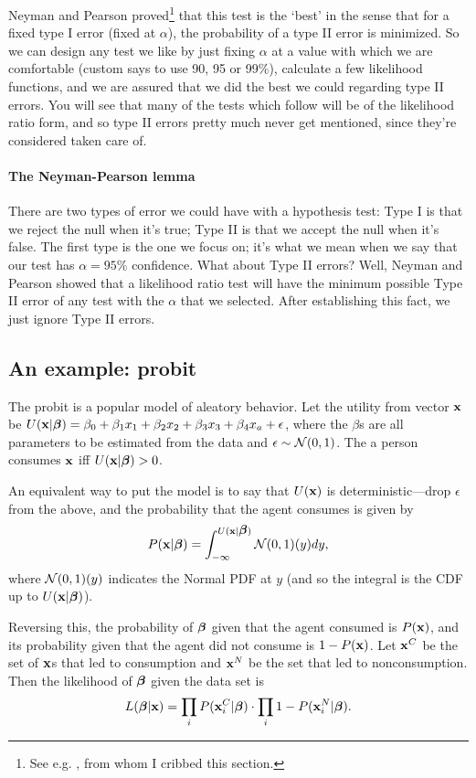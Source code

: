 Neyman and Pearson proved\footnote{See
e.g. \cite[189--191]{amemiya:ez}, from whom I cribbed
this section.}  that this test is the `best' in the sense that for a
fixed type I error (fixed at $\alpha$), the probability of a type II
error is minimized. So we can design any test we like by just fixing $\alpha$
at a value with which we are comfortable (custom says to use
90, 95 or 99\%), calculate a few likelihood functions, and we are assured
that we did the best we could regarding type II errors. You will see that
many of the tests which follow will be of the likelihood ratio form,
and so type II errors pretty much never get mentioned, since they're
considered taken care of.



\paragraph{The Neyman-Pearson lemma} There are two types of error we could
have with a hypothesis test: Type I is that we reject the null when it's
true; Type II is that we accept the null when it's false. The first type
is the one we focus on; it's what we mean when we say that our
test has $\alpha=95\%$ confidence. What about Type II errors? Well,
Neyman and Pearson showed that a likelihood ratio test will have the
minimum possible Type II error of any test with the $\alpha$ that we
selected. After establishing this fact, we just ignore Type II errors.

\subsection{An example: probit} 
The probit is a popular model of aleatory behavior. 
Let the utility from vector ${\bf x}$ be 
$U({\bf x}|{\mbox{\boldmath$\beta$}}) = \beta_0 + \beta_1 x_1 + \beta_2 x_2 + \beta_3 x_3 + \beta_4 x_a + \epsilon$,
where the $\beta$s are all parameters to be estimated from
the data and $\epsilon \sim {\cal N}(0,1)$.
The a person consumes ${\bf x}$ iff $U({\bf x}|{\mbox{\boldmath$\beta$}})>0$. 

An equivalent way to put the model is to say that $U({\bf x})$ is
deterministic---drop $\epsilon$ from the above, and the probability that
the agent consumes is given by
$$P({\bf x}|{\mbox{\boldmath$\beta$}}) = \int_{-\infty}^{U({\bf x}|{\mbox{\boldmath$\beta$}})} {\cal N}(0,1)(y) dy,$$
where ${\cal N}(0,1)(y)$ indicates the Normal PDF at $y$ (and so the
integral is the CDF up to $U({\bf x}|{\mbox{\boldmath$\beta$}})$).

Reversing this, the probability of ${\mbox{\boldmath$\beta$}}$ given that the agent
consumed is $P({\bf x})$, and its probability given that the agent did not
consume is $1-P({\bf x})$. Let ${\bf x}^C$ be the set of ${\bf x}$s that led to
consumption and ${\bf x}^N$ be the set that led to nonconsumption. Then the
likelihood of ${\mbox{\boldmath$\beta$}}$ given the data set is 
$$L({\mbox{\boldmath$\beta$}}|{\bf x}) = \prod_{i} P({\bf x}^C_i|{\mbox{\boldmath$\beta$}}) \cdot \prod_{i} 1-P({\bf x}^N_i|{\mbox{\boldmath$\beta$}}).$$ 

